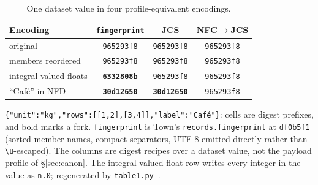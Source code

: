 \documentclass[conference]{IEEEtran}
\begin{document}
\begin{table}[t]
\caption{One dataset value in four profile-equivalent encodings.}
\label{tab:forks}
\centering\small
\setlength{\tabcolsep}{3pt}
\begin{tabular}{l|c|c|c}
\hline
Encoding & \texttt{fingerprint} & JCS & NFC$\rightarrow$JCS \\
\hline
original & \texttt{965293f8} & \texttt{965293f8} & \texttt{965293f8}\\
members reordered & \texttt{965293f8} & \texttt{965293f8} & \texttt{965293f8}\\
integral-valued floats & \textbf{\texttt{6332808b}} & \texttt{965293f8} & \texttt{965293f8}\\
``Caf\'e'' in NFD & \textbf{\texttt{30d12650}} & \textbf{\texttt{30d12650}} & \texttt{965293f8}\\
\hline
\end{tabular}

\vspace{3pt}
\begin{minipage}{\columnwidth}\footnotesize\raggedright
\texttt{\{"unit":"kg","rows":[[1,2],[3,4]],"label":"Caf\'e"\}}: cells are digest prefixes, and bold marks a fork. \texttt{fingerprint} is Town's \texttt{records.fingerprint} at \texttt{df0b5f1} (sorted member names, compact separators, UTF-8 emitted directly rather than \texttt{\textbackslash u}-escaped). The columns are digest recipes over a dataset value, not the payload profile of \S\ref{sec:canon}. The integral-valued-float row writes every integer in the value as \texttt{n.0}; regenerated by \texttt{table1.py}~\cite{artifact}.
\end{minipage}
\end{table}
\end{document}
